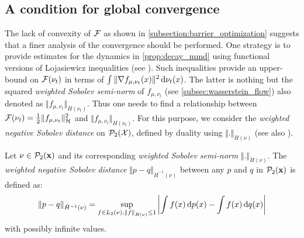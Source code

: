 \subsection{A condition for global convergence}\label{sec:Lojasiewicz_inequality}
The lack of convexity of ${{\mathcal F}}$ as shown in \cref{subsection:barrier_optimization} suggests that a finer analysis of the convergence should be performed. One strategy is to provide estimates for the dynamics in \cref{prop:decay_mmd} 
using functional versions of Lojasiewicz inequalities (see \cite{Bolte:2016}). Such inequalities provide an upper-bound on ${{\mathcal F}}(\nu_t)$ in terms of $\int \Vert \nabla f_{\mu,\nu_t}(x) \Vert^2 \mathop{}\!\mathrm{d} \nu_t(x)$.
The latter is nothing but the squared \textit{weighted Sobolev semi-norm} of $f_{\mu,\nu_t}$ (see \cref{subsec:wasserstein_flow}) also denoted as $\Vert f_{\mu,\nu_t} \Vert_{\dot{H}(\nu_t)}$. Thus one needs to find a relationship between ${{\mathcal F}}(\nu_t) = \frac{1}{2} \Vert f_{\mu,\nu_t} \Vert_{\mathcal{H}}^2 $ and $\Vert f_{\mu,\nu_t} \Vert_{\dot{H}(\nu_t)}$. For this purpose, we consider the \textit{weighted negative Sobolev distance} on $\mathcal{P}_2({{\mathcal X}})$, defined by duality using $\Vert . \Vert_{\dot{H}(\nu)}$ (see also \cite{Peyre:2011}).
\begin{definition}\label{def:neg_sobolev}
	Let $\nu\in \mathcal{P}_2({\mathbf x})$ and its corresponding \textit{weighted Sobolev semi-norm} $ \Vert . \Vert_{\dot{H}(\nu)} $. %
	The \textit{weighted negative Sobolev distance} $\Vert p - q \Vert_{\dot{H}^{-1}(\nu)}$ between any $p$ and $q$ in $\mathcal{P}_2({\mathbf x})$  is defined as:
\begin{align}\label{eq:neg_sobolev}
	\Vert p - q \Vert_{\dot{H}^{-1}(\nu)} = \sup_{f\in L_2(\nu), \Vert f \Vert_{\dot{H}(\nu)} \leq 1 } \left\vert \int f(x)\mathop{}\!\mathrm{d} p(x) - \int f(x)\mathop{}\!\mathrm{d} q(x) \right\vert 
\end{align}	
with possibly infinite values.
\end{definition}
